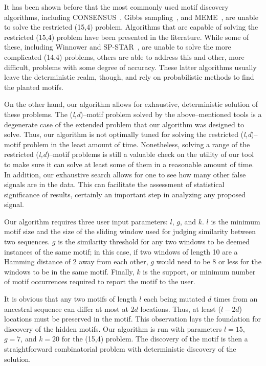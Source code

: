     It has been shown before that the most commonly used motif discovery
    algorithms, including CONSENSUS~\cite{hertz1999identifying}, Gibbs
    sampling~\cite{lawrence1993detecting}, and
    MEME~\cite{bailey1994fitting}, are unable to
    solve the restricted (15,4) problem.  Algorithms that are capable of solving the
    restricted (15,4) problem have been presented in the literature.  While some of
    these, including Winnower and SP-STAR~\cite{pevzner2000combinatorial},
    are unable to solve the more
    complicated (14,4) problems, others are able to address this and other,
    more difficult, problems with some degree of accuracy.  These latter
    algorithms usually leave the deterministic realm, though, and rely on
    probabilistic methods to find the planted motifs.

    On the other hand, our algorithm allows for exhaustive, deterministic solution of these
    problems.  The (\textit{l,d})--motif problem solved by the
    above--mentioned tools is a degenerate case of the extended problem
    that our algorithm was designed to solve.  Thus, our algorithm is not optimally tuned
    for solving the
    restricted (\textit{l,d})--motif problem in the least amount of time.
    Nonetheless, solving a range of the restricted (\textit{l,d})--motif problems
    is still a valuable check on the utility
    of our tool to make sure it can solve at least some of them in a
    reasonable amount of time.  In addition, our exhaustive
    search allows for one to see how many other false signals are in
    the data.  This can facilitate the assessment of statistical
    significance of results, certainly an
    important step in analyzing any proposed signal.

    Our algorithm requires three user input parameters: $l$, $g$, and $k$.  $l$ is the
    minimum motif size and the size of the sliding window used for judging
    similarity between two sequences.  $g$ is the similarity threshold
    for any two windows to be deemed instances of the same motif; in this case,
     if two windows
    of length 10 are a Hamming distance of 2 away from each other, $g$ would need
    to be 8 or less for the windows to be in the same motif.  Finally,
    $k$ is the support, or minimum number of motif occurrences required
    to report the motif to the user.

    It is obvious that any two motifs of length $l$ each being mutated $d$
    times from an ancestral sequence can differ at most at $2d$ locations.
    Thus, at least ($l-2d$) locations must be preserved in the motif.
    This observation lays the foundation for discovery of the hidden motifs.
    Our algorithm is run with parameters $l=15$, $g=7$, and $k=20$
    for the (15,4) problem.  The discovery of the motif is then a
    straightforward combinatorial problem with deterministic
    discovery of the solution.

